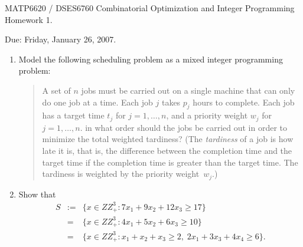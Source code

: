 \documentclass[12pt]{article}
\newcommand{\real}{I\!\! R}
\newcommand{\binary}{I\!\! B}
\newcommand{\integer}{Z\!\!\! Z}
\begin{document}
\begin{center}
  \begin{large}
     MATP6620 / DSES6760 Combinatorial Optimization and Integer Programming \\
       Homework 1.
  \end{large}
\end{center}

\begin{flushright}
   Due:  Friday, January 26, 2007.
\end{flushright}



\begin{enumerate}
   \item  Model the following scheduling problem as a mixed integer
programming problem:
\begin{quote}
A set of $n$ jobs must be carried out on a single machine that can only
do one job at a time.
Each job $j$ takes $p_j$ hours to complete.
Each job has a target time $t_j$ for $j=1,\ldots,n$,
and a priority weight $w_j$ for $j=1,\ldots,n$.
in what order should the jobs be carried out in order to minimize
the total weighted tardiness?
(The {\em tardiness} of a job is how late it is,
that is, the difference between the completion time and
the target time if the completion time is greater than the target time.
The tardiness is weighted by the priority weight~$w_j$.)
\end{quote}
  \item
Show that
\begin{eqnarray*}
S & := & \{x \in \integer_+^3: 7x_1 + 9x_2 + 12x_3  \geq 17\} \\
&=& \{x \in \integer_+^3: 4x_1 + 5x_2 + 6x_3  \geq 10 \}  \\
&=& \{x \in \integer_+^3:
x_1+x_2+x_3 \geq 2, \; 2x_1+3x_3+4x_4 \geq 6 \}.

\end{eqnarray*}
\end{enumerate}
\end{document}
